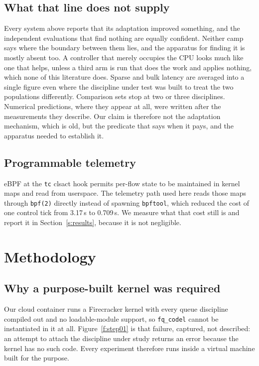 \documentclass[11pt,a4paper]{article}
\begin{document}
\subsection{What that line does not supply}

Every system above reports that its adaptation improved something, and the
independent evaluations that find nothing are equally confident. Neither camp
says where the boundary between them lies, and the apparatus for finding it is
mostly absent too. A controller that merely occupies the CPU looks much like
one that helps, unless a third arm is run that does the work and applies
nothing, which none of this literature does. Sparse and bulk latency are
averaged into a single figure even where the discipline under test was built
to treat the two populations differently. Comparison sets stop at two or three
disciplines. Numerical predictions, where they appear at all, were written
after the measurements they describe. Our claim is therefore not the
adaptation mechanism, which is old, but the predicate that says when it pays,
and the apparatus needed to establish it.

\subsection{Programmable telemetry}

eBPF at the \texttt{tc} clsact hook permits per-flow state to be maintained
in kernel maps and read from userspace\cite{ebpfqdisc2023}. The telemetry
path used here reads those maps through \texttt{bpf(2)} directly instead of
spawning \texttt{bpftool}, which reduced the cost of one control tick from
3.17\,s to 0.709\,s. We measure what that cost still is and report it in
Section~\ref{s:results}, because it is not negligible.

\section{Methodology}\label{s:method}

\subsection{Why a purpose-built kernel was required}

Our cloud container runs a Firecracker kernel with every queue discipline
compiled out and no loadable-module support, so \texttt{fq\_codel} cannot be
instantiated in it at all.
Figure~\ref{f:step01} is that failure, captured, not described: an
attempt to attach the discipline under study returns an error because the
kernel has no such code. Every experiment therefore runs inside a virtual
machine built for the purpose.
\end{document}
